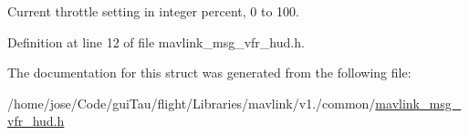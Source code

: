 Current throttle setting in integer percent, 0 to 100. 



Definition at line 12 of file mavlink\-\_\-msg\-\_\-vfr\-\_\-hud.\-h.



The documentation for this struct was generated from the following file\-:\begin{DoxyCompactItemize}
\item 
/home/jose/\-Code/gui\-Tau/flight/\-Libraries/mavlink/v1./common/\hyperlink{mavlink__msg__vfr__hud_8h}{mavlink\-\_\-msg\-\_\-vfr\-\_\-hud.\-h}\end{DoxyCompactItemize}
